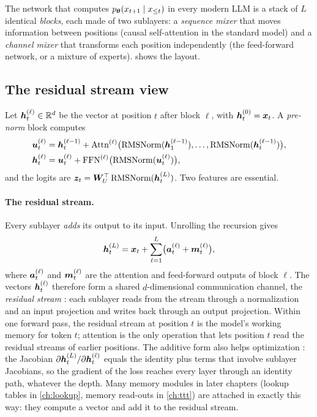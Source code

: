 The network that computes $p_{\bm{\theta}}(x_{t+1}\mid x_{\le t})$ in every modern LLM is a stack
of $L$ identical \emph{blocks}, each made of two sublayers: a \emph{sequence mixer} that
moves information between positions (causal self-attention in the standard model) and a
\emph{channel mixer} that transforms each position independently (the feed-forward network,
or a mixture of experts).  shows the layout.

\subsection{The residual stream view}\label{sec:c01-residual}

Let $\bm{h}_t^{(\ell)} \in \mathbb{R}^{d}$ be the vector at position $t$ after block $\ell$, with
$\bm{h}_t^{(0)} = \bm{x}_t$. A \emph{pre-norm} block computes
\begin{align}
  \bm{u}_t^{(\ell)} &= \bm{h}_t^{(\ell-1)}
     + \mathrm{Attn}^{(\ell)}\bigl(\operatorname{RMSNorm}(\bm{h}_1^{(\ell-1)}), \dots, \operatorname{RMSNorm}(\bm{h}_t^{(\ell-1)})\bigr),
     \label{eq:c01-block-attn}\\
  \bm{h}_t^{(\ell)} &= \bm{u}_t^{(\ell)} + \mathrm{FFN}^{(\ell)}\bigl(\operatorname{RMSNorm}(\bm{u}_t^{(\ell)})\bigr),
     \label{eq:c01-block-ffn}
\end{align}
and the logits are $\bm{z}_t = \bm{W}_U^{\top} \operatorname{RMSNorm}(\bm{h}_t^{(L)})$. Two features are essential.

\paragraph{The residual stream.} Every sublayer \emph{adds} its output to its input. Unrolling
the recursion gives
\begin{equation}\label{eq:c01-residual-sum}
  \bm{h}_t^{(L)} = \bm{x}_t + \sum_{\ell=1}^{L}\bigl(\bm{a}_t^{(\ell)} + \bm{m}_t^{(\ell)}\bigr),
\end{equation}
where $\bm{a}_t^{(\ell)}$ and $\bm{m}_t^{(\ell)}$ are the attention and feed-forward outputs of
block $\ell$. The vectors $\bm{h}_t^{(\ell)}$ therefore form a shared $d$-dimensional
communication channel, the \emph{residual stream} \citep{c01-elhage2021circuits}: each
sublayer reads from the stream through a normalization and an input projection and writes
back through an output projection. Within one forward pass, the residual stream at position
$t$ is the model's working memory for token $t$; attention is the only operation that lets
position $t$ read the residual streams of earlier positions. The additive form also helps
optimization \citep{c01-he2016resnet}: the Jacobian
$\partial \bm{h}_t^{(L)}/\partial \bm{h}_t^{(\ell)}$ equals the identity plus terms that involve
sublayer Jacobians, so the gradient of the loss reaches every layer through an
identity path, whatever the depth. Many memory modules in later chapters (lookup tables in
\cref{ch:lookup}, memory read-outs in \cref{ch:ttt}) are attached in exactly this way: they
compute a vector and add it to the residual stream.

